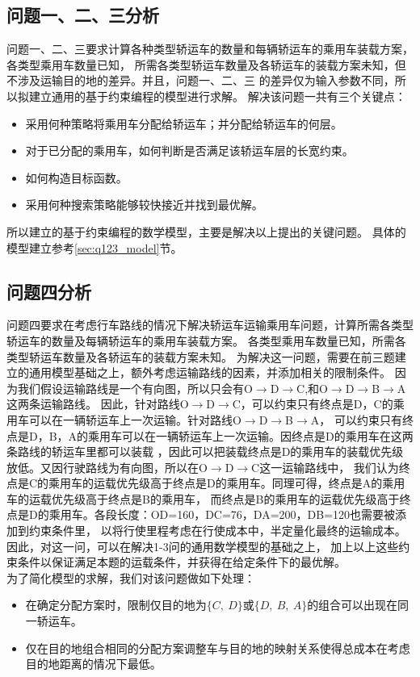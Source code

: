 \documentclass[UTF8]{ctexart}
\begin{document}
\subsection{问题一、二、三分析}
问题一、二、三要求计算各种类型轿运车的数量和每辆轿运车的乘用车装载方案，各类型乘用车数量已知，
所需各类型轿运车数量及各轿运车的装载方案未知，但不涉及运输目的地的差异。并且，问题一、二、三
的差异仅为输入参数不同，所以拟建立通用的基于约束编程的模型进行求解。
解决该问题一共有三个关键点：
\begin{itemize}
	\item 采用何种策略将乘用车分配给轿运车；并分配给轿运车的何层。
	\item 对于已分配的乘用车，如何判断是否满足该轿运车层的长宽约束。
	\item 如何构造目标函数。
	\item 采用何种搜索策略能够较快接近并找到最优解。
\end{itemize}
所以建立的基于约束编程的数学模型，主要是解决以上提出的关键问题。
具体的模型建立参考\ref{sec:q123_model}节。




\subsection{问题四分析}
问题四要求在考虑行车路线的情况下解决轿运车运输乘用车问题，计算所需各类型轿运车的数量及每辆轿运车的乘用车装载方案。
各类型乘用车数量已知，所需各类型轿运车数量及各轿运车的装载方案未知。
为解决这一问题，需要在前三题建立的通用模型基础之上，额外考虑运输路线的因素，并添加相关的限制条件。
因为我们假设运输路线是一个有向图，所以只会有O$\rightarrow$D$\rightarrow$C,和O$\rightarrow$D$\rightarrow$B$\rightarrow$A这两条运输路线。
因此，针对路线O$\rightarrow$D$\rightarrow$C，可以约束只有终点是D，C的乘用车可以在一辆轿运车上一次运输。针对路线O$\rightarrow$D$\rightarrow$B$\rightarrow$A，
可以约束只有终点是D，B，A的乘用车可以在一辆轿运车上一次运输。因终点是D的乘用车在这两条路线的轿运车里都可以装载
，因此可以把装载终点是D的乘用车的装载优先级放低。又因行驶路线为有向图，所以在O$\rightarrow$D$\rightarrow$C这一运输路线中，
我们认为终点是C的乘用车的运载优先级高于终点是D的乘用车。同理可得，终点是A的乘用车的运载优先级高于终点是B的乘用车，
而终点是B的乘用车的运载优先级高于终点是D的乘用车。各段长度：OD=160，DC=76，DA=200，DB=120也需要被添加到约束条件里，
以将行使里程考虑在行使成本中，半定量化最终的运输成本。因此，对这一问，可以在解决1-3问的通用数学模型的基础之上，
加上以上这些约束条件以保证满足本题的运载条件，并获得在给定条件下的最优解。\\
为了简化模型的求解，我们对该问题做如下处理：
\begin{itemize}
	\item 在确定分配方案时，限制仅目的地为$\{C,~D\}$或$\{D,~B,~A\}$的组合可以出现在同一轿运车。
	\item 仅在目的地组合相同的分配方案调整车与目的地的映射关系使得总成本在考虑目的地距离的情况下最低。
\end{itemize}
\end{document}
